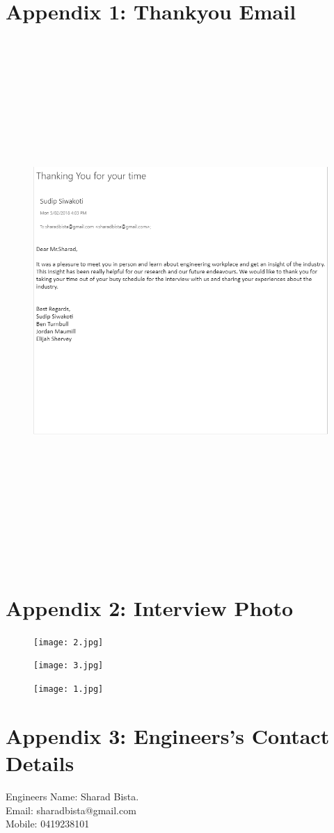 \documentclass{article}
\begin{document}
\section{Appendix 1: Thankyou Email}\label{sec:appendix }
\begin{figure}[h!]
	\centering
    \includegraphics[height= 20cm,width=1\textwidth]{thankyou.PNG}
    \end{figure}
    
\section{Appendix 2: Interview Photo}\label{sec: Questionnaires }
\begin{figure}[h!]
	\centering
    \texttt{[image: 2.jpg]}\linebreak
     
    \centering
    \texttt{[image: 3.jpg]}\linebreak
   
   
    \centering
    \texttt{[image: 1.jpg]}\linebreak
    \end{figure}\pagebreak

\section{Appendix 3: Engineers's Contact Details}\label{sec:APPENDIX3}

\centering
Engineers Name: Sharad Bista.\\
Email: sharadbista@gmail.com\\
Mobile: 0419238101
\end{document}
